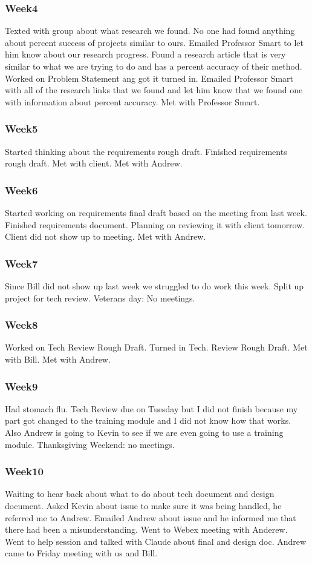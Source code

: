 \subsubsection*{Week4}
Texted with group about what research we found. No one had found anything about percent success of projects similar to ours. Emailed Professor Smart to let him know about our research progress. Found a research article that is very similar to what we are trying to do and has a percent accuracy of their method. Worked on Problem Statement ang got it turned in. Emailed Professor Smart with all of the research links that we found and let him know that we found one with information about percent accuracy. Met with Professor Smart.
\subsubsection*{Week5}
Started thinking about the requirements rough draft. Finished requirements rough draft. Met with client. Met with Andrew.
\subsubsection*{Week6}
Started working on requirements final draft based on the meeting from last week. Finished requirements document. Planning on reviewing it with client tomorrow. Client did not show up to meeting. Met with Andrew.
\subsubsection*{Week7}
Since Bill did not show up last week we struggled to do work this week. Split up project for tech review. Veterans day: No meetings.
\subsubsection*{Week8}
Worked on Tech Review Rough Draft. Turned in Tech. Review Rough Draft. Met with Bill. Met with Andrew.
\subsubsection*{Week9}
Had stomach flu. Tech Review due on Tuesday but I did not finish because my part got changed to the training module and I did not know how that works. Also Andrew is going to Kevin to see if we are even going to use a training module. Thanksgiving Weekend: no meetings. 
\subsubsection*{Week10}
Waiting to hear back about what to do about tech document and design document. Asked Kevin about issue to make sure it was being handled, he referred me to Andrew. Emailed Andrew about issue and he informed me that there had been a misunderstanding. Went to Webex meeting with Anderew. Went to help session and talked with Claude about final and design doc. Andrew came to Friday meeting with us and Bill.

